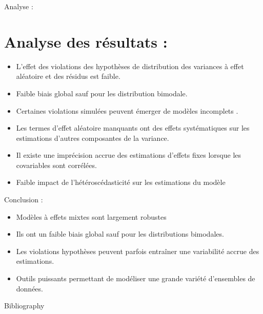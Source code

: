 \documentclass[unknownkeysallowed]{beamer}
\begin{document}
\begin{frame}{Analyse : }
\section{Analyse des résultats :}
 \begin{itemize}
        \item L'effet des violations des hypothèses de distribution des variances à effet aléatoire et des résidus est  faible.
        \item Faible biais global sauf pour les distribution bimodale.
        \item Certaines violations simulées peuvent  émerger de modèles incomplets .			\item Les termes d'effet aléatoire manquants ont des effets systématiques sur les estimations d'autres composantes de la variance.
\item Il existe une imprécision accrue des estimations d'effets fixes lorsque les covariables sont corrélées.
\item Faible impact de l'hétéroscédasticité sur les estimations du modèle
    \end{itemize}

\end{frame}

\begin{frame}{Conclusion : }
 \begin{itemize}
        \item 
\Lesecs Modèles à effets mixtes sont largement robustes
        \item Ils ont un faible biais global sauf pour les distributions bimodales.
        \item Les violations hypothèses peuvent parfois entraîner une variabilité accrue des estimations.			
\item Outils puissants permettant de modéliser une grande variété d'ensembles de données. 
    \end{itemize}

\end{frame}






\begin{frame}{Bibliography}
\nocite{*}
\printbibliography
\end{frame}
\end{document}
